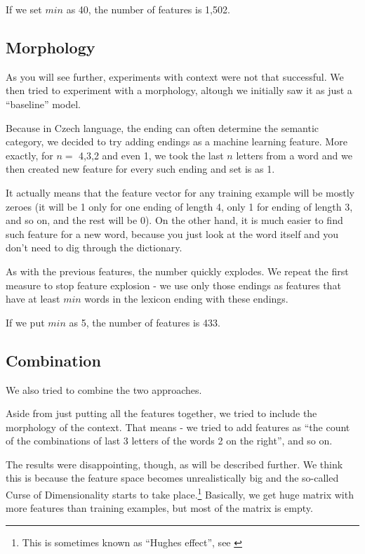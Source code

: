\documentclass[letterpaper]{article}
\begin{document}
If we set $min$ as 40, the number of features is 1,502.

\subsection{Morphology}
As you will see further, experiments with context were not that successful. 
We then tried to experiment with a morphology, altough we initially saw it as just a ``baseline'' model.

Because in Czech language, the ending can often determine the semantic category, 
we decided to try adding endings as a machine learning feature. 
More exactly, for $n=$ 4,3,2 and even 1, we took the last $n$ letters from 
a word and we then created new feature for every such ending and set is as 1.

It actually means that the feature vector for any training example will be mostly zeroes 
(it will be 1 only for one ending of length 4, only 1 for ending of length 3, and so on, 
and the rest will be 0). On the other hand, it is much easier to find such feature 
for a new word, because you just look at the word itself and you don't need to dig through the dictionary.

As with the previous features, the number quickly explodes. We repeat the first measure 
to stop feature explosion - we use only those endings as features that have at least $min$ words in the lexicon ending with these endings.

If we put $min$ as 5, the number of features is 433.

\subsection{Combination}
We also tried to combine the two approaches.

Aside from just putting all the features together, we tried to include the morphology of the context. 
That means - we tried to add features as ``the count of the combinations of last 3 letters of the words 2 on the right'', and so on.

The results were disappointing, though, as will be described further. 
We think this is because the feature space becomes unrealistically big and the so-called Curse of Dimensionality starts to take place.\footnote{This is sometimes known as ``Hughes effect'', see \cite{hughes:1968}} Basically, we get huge matrix with more features than training examples, but most of the matrix is empty.
\end{document}
